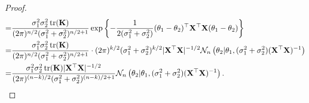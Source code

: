 \documentclass[11pt]{article}
\DeclareMathOperator{\mytr}{tr}
\theoremstyle{plain}
\theoremstyle{definition}
\theoremstyle{remark}
\begin{document}
\begin{proof}
\begin{equation*}
\begin{split}
    =&
    \frac{\sigma_1^2 \sigma_2^2 \mytr(\BK) }{(2\pi)^{n/2} (\sigma_1^2 +\sigma_2^2)^{n/2+1}  }
    \exp\left\{
        -\frac{1}{2(\sigma_1^2 + \sigma_2^2)}
        (\theta_1-\theta_2)^\top \BX^\top \BX (\theta_1-\theta_2)
        \right\}
    \\
    =&
    \frac{\sigma_1^2 \sigma_2^2 \mytr(\BK) }{(2\pi)^{n/2} (\sigma_1^2 +\sigma_2^2)^{n/2+1}  }
    \cdot (2\pi)^{k/2} (\sigma_1^2 +\sigma_2^2)^{k/2} |\BX^\top \BX|^{-1/2}
    \mathcal N_n \left(\theta_2 |\theta_1,(\sigma_1^2 +\sigma_2^2) (\BX^\top \BX)^{-1}\right)
    \\
    =&
    \frac{\sigma_1^2 \sigma_2^2 \mytr(\BK) |\BX^\top \BX|^{-1/2} }{ (2\pi)^{(n-k)/2}(\sigma_1^2 +\sigma_2^2)^{(n-k)/2+1}  }  
    \mathcal N_n \left(\theta_2 |\theta_1,(\sigma_1^2 +\sigma_2^2) (\BX^\top \BX)^{-1}\right)
    .
        \end{split}
\end{equation*}
\end{proof}
\end{document}

